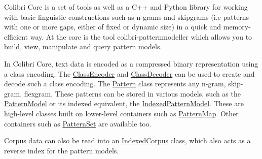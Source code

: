Colibri Core is a set of tools as well as a C++ and Python library for working with basic linguistic constructions such as n-\/grams and skipgrams (i.\+e patterns with one or more gaps, either of fixed or dynamic size) in a quick and memory-\/efficient way. At the core is the tool colibri-\/patternmodeller which allows you to build, view, manipulate and query pattern models.

In Colibri Core, text data is encoded as a compressed binary representation using a class encoding. The \hyperlink{classClassEncoder}{Class\+Encoder} and \hyperlink{classClassDecoder}{Class\+Decoder} can be used to create and decode such a class encoding. The \hyperlink{classPattern}{Pattern} class represents any n-\/gram, skip-\/gram, flexgram. These patterns can be stored in various models, such as the \hyperlink{classPatternModel}{Pattern\+Model} or it\textquotesingle{}s indexed equivalent, the \hyperlink{classIndexedPatternModel}{Indexed\+Pattern\+Model}. These are high-\/level classes built on lower-\/level containers such as \hyperlink{classPatternMap}{Pattern\+Map}. Other containers such as \hyperlink{classPatternSet}{Pattern\+Set} are available too.

Corpus data can also be read into an \hyperlink{classIndexedCorpus}{Indexed\+Corpus} class, which also acts as a reverse index for the pattern models. 